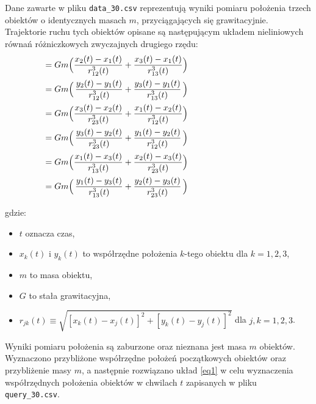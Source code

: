 \documentclass[a4paper, 12pt, twoside, openany]{article}
\begin{document}
	Dane zawarte w pliku \texttt{data\_30.csv} reprezentują wyniki pomiaru położenia trzech obiektów o
	identycznych masach $m$, przyciągających się grawitacyjnie. Trajektorie ruchu tych obiektów opisane
	są następującym układem nieliniowych równań różniczkowych zwyczajnych drugiego rzędu:\\
	\begin{equation}	
		\label{eq1}
		\hspace{-5cm}
		\left\{
		\begin{alignedat}{4}
			\dfrac{d^2x_1(t)}{dt^2} & = Gm \Big( & \dfrac{x_2(t) - x_1(t)}{r^3_{12}(t)} & + \dfrac{x_3(t) - x_1(t)}{r^3_{13}(t)} & \Big) \\ \vspace{5em}
			\dfrac{d^2y_1(t)}{dt^2} & = Gm \Big( & \dfrac{y_2(t) - y_1(t)}{r^3_{12}(t)} & + \dfrac{y_3(t) - y_1(t)}{r^3_{13}(t)} & \Big) \\ \vspace{5em}
			\dfrac{d^2x_2(t)}{dt^2} & = Gm \Big( & \dfrac{x_3(t) - x_2(t)}{r^3_{23}(t)} & + \dfrac{x_1(t) - x_2(t)}{r^3_{12}(t)} & \Big) \\ \vspace{5em}
			\dfrac{d^2y_2(t)}{dt^2} & = Gm \Big( & \dfrac{y_3(t) - y_2(t)}{r^3_{23}(t)} & + \dfrac{y_1(t) - y_2(t)}{r^3_{12}(t)} & \Big) \\ \vspace{5em}
			\dfrac{d^2x_3(t)}{dt^2} & = Gm \Big( & \dfrac{x_1(t) - x_3(t)}{r^3_{13}(t)} & + \dfrac{x_2(t) - x_3(t)}{r^3_{23}(t)} & \Big) \\ \vspace{5em}
			\dfrac{d^2y_3(t)}{dt^2} & = Gm \Big( & \dfrac{y_1(t) - y_3(t)}{r^3_{13}(t)} & + \dfrac{y_2(t) - y_3(t)}{r^3_{23}(t)} & \Big) \\
		\end{alignedat}
		\right.
	\end{equation}\vspace{1em}

	gdzie:
	\begin{itemize}[label=\footnotesize$\bullet$, topsep=0pt, parsep=0pt, leftmargin=10mm]
		\item $t$ oznacza czas,
		\item $x_k(t)$ i $y_k(t)$ to współrzędne położenia $k$-tego obiektu dla $k = 1,2,3$,
		\item $m$ to masa obiektu,
		\item $G$ to stała grawitacyjna,
		\item $r_{jk}(t) \equiv \sqrt{\left[x_k(t) - x_j(t)\right]^2 + \left[y_k(t) - y_j(t)\right]^2}$ dla $j,k = 1,2,3$.\\
	\end{itemize}
	\noindent
	Wyniki pomiaru położenia są zaburzone oraz nieznana jest masa $m$ obiektów. Wyznaczono przybliżone współrzędne położeń początkowych obiektów oraz przybliżenie masy $m$, a następnie rozwiązano układ \eqref{eq1} w celu wyznaczenia współrzędnych położenia obiektów w chwilach $t$ zapisanych w pliku \texttt{query\_30.csv}.\\
	
\end{document}
